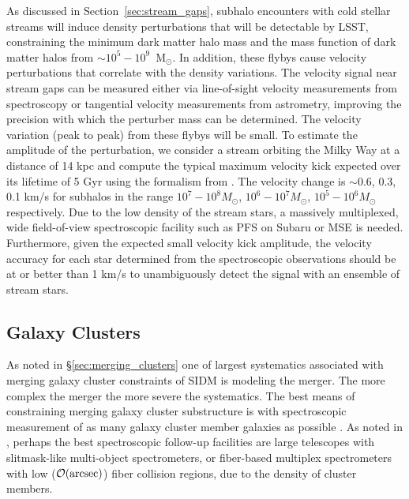 As discussed in Section~\ref{sec:stream_gaps}, subhalo encounters with cold stellar streams will induce density perturbations that will be detectable by LSST, constraining the minimum dark matter halo mass and the mass function of dark matter halos from $\sim10^{5} - 10^{9}$~M$_{\odot}$. In addition, these flybys cause velocity perturbations that correlate with the density variations.  The velocity signal near stream gaps can be measured either via line-of-sight velocity measurements from spectroscopy or tangential velocity measurements from astrometry, improving the precision with which the perturber mass can be determined.
The velocity variation (peak to peak) from these flybys will be small. To estimate the amplitude of the perturbation, we consider a stream orbiting the Milky Way at a distance of 14 kpc and compute the typical maximum velocity kick expected over its lifetime of 5 Gyr using the formalism from \cite{erkal2016}.  The velocity change is $\sim$0.6, 0.3, 0.1 km/s for subhalos in the range $10^7-10^8 M_\odot$, $10^6-10^7 M_\odot$, $10^5 -10^6 M_\odot$ respectively. Due to the low density of the stream stars, a massively multiplexed, wide field-of-view spectroscopic facility such as PFS on Subaru or MSE is needed. Furthermore, given the expected small velocity kick amplitude, the velocity accuracy for each star determined from the spectroscopic observations should be at or better than 1 km/s to unambiguously detect the signal with an ensemble of stream stars.

\subsection{Galaxy Clusters }
As noted in \S\ref{sec:merging_clusters} one of largest systematics associated with merging galaxy cluster constraints of SIDM is modeling the merger. The more complex the merger the more severe the systematics.
The best means of constraining merging galaxy cluster substructure is with spectroscopic measurement of as many galaxy cluster member galaxies as possible \cite[see e.g.,][]{2018arXiv180610619G}.
As noted in \cite{2016arXiv161001661N}, perhaps the best spectroscopic follow-up facilities are large telescopes with slitmask-like multi-object spectrometers, or fiber-based multiplex spectrometers with low ($\mathcal{O}(\hbox{arcsec})$) fiber collision regions, due to the density of cluster members.

